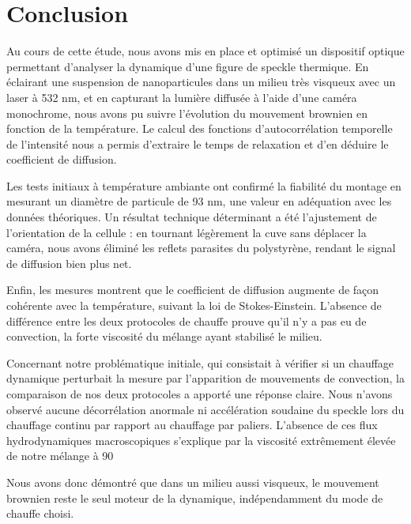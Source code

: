 \section{Conclusion}

Au cours de cette étude, nous avons mis en place et optimisé un dispositif optique permettant d'analyser la dynamique d'une figure de speckle thermique. En éclairant une suspension de nanoparticules dans un milieu très visqueux avec un laser à 532 nm, et en capturant la lumière diffusée à l'aide d'une caméra monochrome, nous avons pu suivre l'évolution du mouvement brownien en fonction de la température. Le calcul des fonctions d'autocorrélation temporelle de l'intensité nous a permis d'extraire le temps de relaxation et d'en déduire le coefficient de diffusion.

Les tests initiaux à température ambiante ont confirmé la fiabilité du montage en mesurant un diamètre de particule de 93 nm, une valeur en adéquation avec les données théoriques. Un résultat technique déterminant a été l'ajustement de l'orientation de la cellule : en tournant légèrement la cuve sans déplacer la caméra, nous avons éliminé les reflets parasites du polystyrène, rendant le signal de diffusion bien plus net. 

Enfin, les mesures montrent que le coefficient de diffusion augmente de façon cohérente avec la température, suivant la loi de Stokes-Einstein. L'absence de différence entre les deux protocoles de chauffe prouve qu'il n'y a pas eu de convection, la forte viscosité du mélange ayant stabilisé le milieu.

Concernant notre problématique initiale, qui consistait à vérifier si un chauffage dynamique perturbait la mesure par l'apparition de mouvements de convection, la comparaison de nos deux protocoles a apporté une réponse claire. Nous n'avons observé aucune décorrélation anormale ni accélération soudaine du speckle lors du chauffage continu par rapport au chauffage par paliers. L'absence de ces flux hydrodynamiques macroscopiques s'explique par la viscosité extrêmement élevée de notre mélange à 90 %

Nous avons donc démontré que dans un milieu aussi visqueux, le mouvement brownien reste le seul moteur de la dynamique, indépendamment du mode de chauffe choisi.